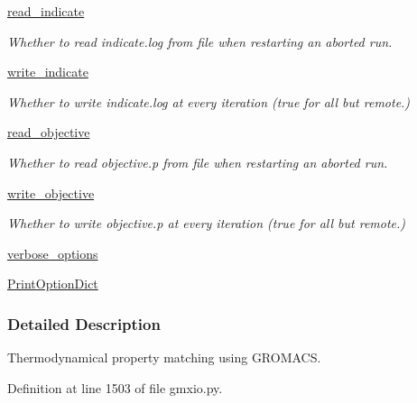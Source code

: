\begin{DoxyCompactItemize}
\hyperlink{classforcebalance_1_1target_1_1Target_aa8af57d5be669c4bb1c0cfd4b7a9220e}{read\-\_\-indicate}
\begin{DoxyCompactList}\small\item\em Whether to read indicate.\-log from file when restarting an aborted run. \end{DoxyCompactList}\item 
\hyperlink{classforcebalance_1_1target_1_1Target_a3a2f5d4bbb8d6ecb580eadb261977a57}{write\-\_\-indicate}
\begin{DoxyCompactList}\small\item\em Whether to write indicate.\-log at every iteration (true for all but remote.) \end{DoxyCompactList}\item 
\hyperlink{classforcebalance_1_1target_1_1Target_a22bdc4bbce2020ae44b44ad3e444fda6}{read\-\_\-objective}
\begin{DoxyCompactList}\small\item\em Whether to read objective.\-p from file when restarting an aborted run. \end{DoxyCompactList}\item 
\hyperlink{classforcebalance_1_1target_1_1Target_a7a95624dfe03f0cee0e5f1ae09db306a}{write\-\_\-objective}
\begin{DoxyCompactList}\small\item\em Whether to write objective.\-p at every iteration (true for all but remote.) \end{DoxyCompactList}\item 
\hyperlink{classforcebalance_1_1BaseClass_afd68efa29ccd2f320f4cf82198214aac}{verbose\-\_\-options}
\item 
\hyperlink{classforcebalance_1_1BaseClass_afc6659278497d7245bc492ecf405ccae}{Print\-Option\-Dict}
\end{DoxyCompactItemize}


\subsubsection{Detailed Description}
Thermodynamical property matching using G\-R\-O\-M\-A\-C\-S. 



Definition at line 1503 of file gmxio.\-py.



